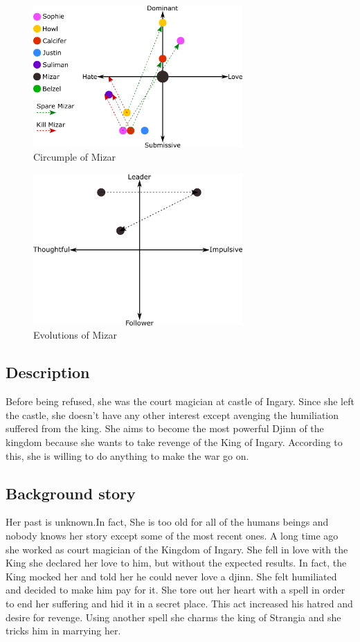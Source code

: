 \begin{figure}
  \centering
  \includegraphics[width=8cm]{Images/Circumplexes/mizarCircumplex}
  \caption{Circumple of Mizar}
\end{figure}

\begin{figure}
  \centering
   \includegraphics[width=8cm]{Images/Evolutions/mizarEvolution}
  \caption{Evolutions of Mizar}
\end{figure}

\subsection{Description}
Before being refused, she was the court magician at castle of Ingary. Since she left the castle, she doesn't have any other interest except avenging the humiliation suffered from the king.
She aims to become the most powerful Djinn of the kingdom because she wants to take revenge of the King of Ingary. According to this, she is willing to do anything to make the war go on.

\subsection{Background story}
Her past is unknown.In fact, She is too old for all of the humans beings and nobody knows her story except some of the most recent ones. A long time ago she worked as court magician of the Kingdom of Ingary. She fell in love with the King she declared her love to him, but without the expected results. In fact, the King mocked her and told her he could never love a djinn. She felt humiliated and decided to make him pay for it. She tore out her heart with a spell in order to end her suffering and hid it in a secret place. This act increased his hatred and desire for revenge. Using another spell she charms the king of Strangia and she tricks him in marrying her.



